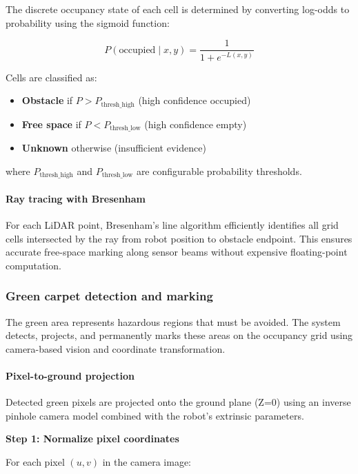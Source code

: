 \documentclass{article}
\begin{document}
The discrete occupancy state of each cell is determined by converting log-odds to probability using the sigmoid function:

$$
P(\text{occupied} \mid x,y) = \frac{1}{1 + e^{-L(x,y)}}
$$

\noindent Cells are classified as:
\begin{itemize}
    \item \textbf{Obstacle} if $P > P_{\text{thresh\_high}}$ (high confidence occupied)
    \item \textbf{Free space} if $P < P_{\text{thresh\_low}}$ (high confidence empty)
    \item \textbf{Unknown} otherwise (insufficient evidence)
\end{itemize}

\noindent where $P_{\text{thresh\_high}}$ and $P_{\text{thresh\_low}}$ are configurable probability thresholds.

\paragraph{Ray tracing with Bresenham}

For each LiDAR point, Bresenham's line algorithm efficiently identifies all grid cells intersected by the ray from robot position to obstacle endpoint. This ensures accurate free-space marking along sensor beams without expensive floating-point computation.

\subsubsection{Green carpet detection and marking}

The green area represents hazardous regions that must be avoided. The system detects, projects, and permanently marks these areas on the occupancy grid using camera-based vision and coordinate transformation.

\paragraph{Pixel-to-ground projection}

Detected green pixels are projected onto the ground plane (Z=0) using an inverse pinhole camera model combined with the robot's extrinsic parameters.

\textbf{Step 1: Normalize pixel coordinates}

For each pixel $(u, v)$ in the camera image:
\end{document}
